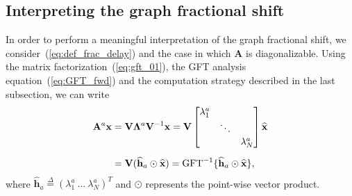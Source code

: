 \subsection{Interpreting the graph fractional shift}\label{subsec:interpret}
In order to perform a meaningful interpretation of the graph fractional shift, we consider~(\ref{eq:def_frac_delay}) and the case in which $\mathbf{A}$ is diagonalizable. Using the matrix factorization~(\ref{eq:gft_01}), the GFT analysis equation~(\ref{eq:GFT_fwd}) and the computation strategy described in the last subsection, we can write
\begin{align}\label{eq:frac_delay_01}
    \mathbf{A}^a \mathbf{x} & = \mathbf{V} \mathbf{\Lambda}^a \mathbf{V}^{-1} \mathbf{x} = \mathbf{V}
    \begin{bmatrix}
        \lambda_1^a &        &             \\
                    & \ddots &             \\
                    &        & \lambda_N^a
    \end{bmatrix}
    \widehat{\mathbf{x}} \notag                                                                                                                                         \\[0.5em]
                            & = \mathbf{V} (\widehat{\mathbf{h}}_a \odot \widehat{\mathbf{x}}) = \text{GFT}^{-1} \{\widehat{\mathbf{h}}_a \odot \widehat{\mathbf{x}}\},
\end{align}
where $\widehat{\mathbf{h}}_a \overset{\Delta}{=} (\lambda_1^a \ \ldots \ \lambda_N^a)^T$ and $\odot$ represents the point-wise vector product.

